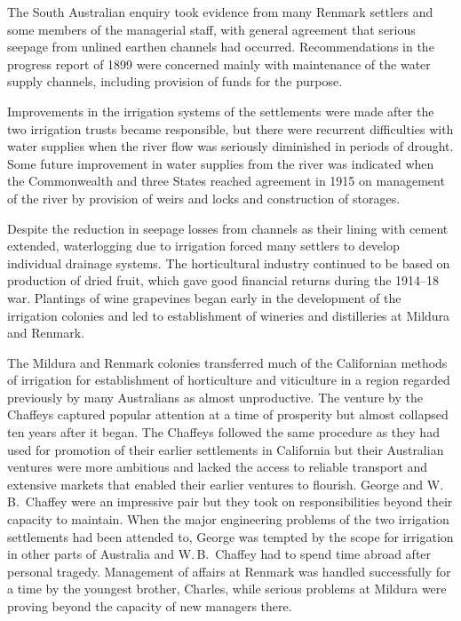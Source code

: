 The South Australian enquiry took evidence from many Renmark settlers
and some members of the managerial staff, with general agreement that
serious seepage from unlined earthen channels had occurred.
Recommendations in the progress report of 1899 were concerned mainly
with maintenance of the water supply channels, including provision of
funds for the purpose.

Improvements in the irrigation systems of the settlements were made
after the two irrigation trusts became responsible, but there were
recurrent difficulties with water supplies when the river flow was
seriously diminished in periods of drought.  Some future improvement
in water supplies from the river was indicated when the Commonwealth
and three States reached agreement in 1915 on management of the river
by provision of weirs and locks and construction of storages.

Despite the reduction in seepage losses from channels as their lining
with cement extended, waterlogging due to irrigation forced many
settlers to develop individual drainage systems.  The horticultural
industry continued to be based on production of dried fruit, which
gave good financial returns during the 1914--18 war.  Plantings of
wine grapevines began early in the development of the irrigation
colonies and led to establishment of wineries and distilleries at
Mildura and Renmark.

\closure
The Mildura and Renmark colonies transferred much of the Californian
methods of irrigation for establishment of horticulture and
viticulture in a region regarded previously by many Australians as
almost unproductive.  The venture by the Chaffeys captured popular
attention at a time of prosperity but almost collapsed ten years after
it began.  The Chaffeys followed the same procedure as they had used
for promotion of their earlier settlements in California but their
Australian ventures were more ambitious and lacked the access to
reliable transport and extensive markets that enabled their earlier
ventures to flourish.  George and W.\,B.~Chaffey were an impressive
pair but they took on responsibilities beyond their capacity to
maintain.  When the major engineering problems of the two irrigation
settlements had been attended to, George was tempted by the scope for
irrigation in other parts of Australia and W.\,B.~Chaffey had to spend
time abroad after personal tragedy.  Management of affairs at Renmark
was handled successfully for a time by the youngest brother, Charles,
while serious problems at Mildura were proving beyond the capacity of
new managers there.

